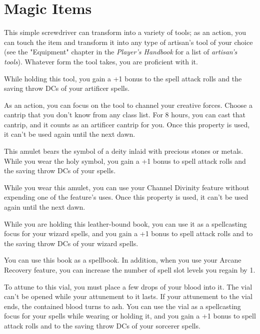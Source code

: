 \documentclass[10pt,a4paper,twoside,bg=print,twocolumn,openany,nodeprecatedcode]{dndbook}
\begin{document}
\chapter{Magic Items}
This simple screwdriver can transform into a variety of tools; as an action, you can touch the item and transform it into any type of artisan's tool of your choice (see the "Equipment" chapter in the \textit{Player's Handbook} for a list of \textit{artisan's tools}). Whatever form the tool takes, you are proficient with it.

While holding this tool, you gain a +1 bonus to the spell attack rolls and the saving throw DCs of your artificer spells.

As an action, you can focus on the tool to channel your creative forces. Choose a cantrip that you don't know from any class list. For 8 hours, you can cast that cantrip, and it counts as an artificer cantrip for you. Once this property is used, it can't be used again until the next dawn.

This amulet bears the symbol of a deity inlaid with precious stones or metals. While you wear the holy symbol, you gain a +1 bonus to spell attack rolls and the saving throw DCs of your spells.

While you wear this amulet, you can use your Channel Divinity feature without expending one of the feature's uses. Once this property is used, it can't be used again until the next dawn.

While you are holding this leather-bound book, you can use it as a spellcasting focus for your wizard spells, and you gain a +1 bonus to spell attack rolls and to the saving throw DCs of your wizard spells.

You can use this book as a spellbook. In addition, when you use your Arcane Recovery feature, you can increase the number of spell slot levels you regain by 1.

To attune to this vial, you must place a few drops of your blood into it. The vial can't be opened while your attunement to it lasts. If your attunement to the vial ends, the contained blood turns to ash. You can use the vial as a spellcasting focus for your spells while wearing or holding it, and you gain a +1 bonus to spell attack rolls and to the saving throw DCs of your sorcerer spells.
\end{document}
